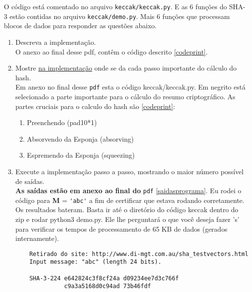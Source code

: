 \documentclass[12pt, a4paper]{article}
\begin{document}
\begin{enumerate}
O código está comentado no arquivo \verb|keccak/keccak.py|. E as 6 funções
do SHA-3 estão contidas no arquivo \verb|keccak/demo.py|. Mais 6 funções que
processam blocos de dados para responder as questões abaixo.

\begin{enumerate}

\item Descreva a implementação.\\

O anexo ao final desse pdf, contêm o código descrito \ref{codeprint}.\\

\item Mostre \underline{na implementação} onde se da cada passo importante do
cálculo do hash.\\

Em anexo no final desse \verb|pdf| esta o código keccak/keccak.py. Em negrito
está selecionado a parte importante para o cálculo do resumo criptográfico. As
partes cruciais para o calculo do hash são \ref{codeprint}:\\

  \begin{enumerate}
    \item Preenchendo (pad10*1)
    \item Absorvendo da Esponja (absorving)
    \item Espremendo da Esponja (squeezing)\\
  \end{enumerate}

\item Execute a implementação passo a passo, mostrando o maior número possível
de saídas.\\

{\bfseries As saídas estão em anexo ao final do} \verb|pdf|
\ref{saidasprograma}. Eu rodei o código para \textbf{M} = {\color{Red}
\verb|'abc'|} a fim de certificar que estava rodando corretamente. Os resultados
bateram. Basta ir até o diretório do código keccak dentro do zip e rodar python3
demo.py. Ele lhe perguntará o que você deseja fazer 's' para verificar os tempos
de processamento de 65 KB de dados (gerados internamente).

  \begin{verbatim}
    Retirado do site: http://www.di-mgt.com.au/sha_testvectors.html
    Input message: "abc" (length 24 bits).

    SHA-3-224 e642824c3f8cf24a d09234ee7d3c766f
              c9a3a5168d0c94ad 73b46fdf


\end{verbatim}
\end{enumerate}
\end{enumerate}
\end{document}
